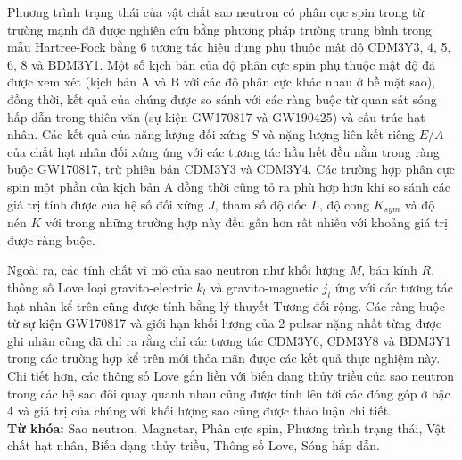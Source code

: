 Phương trình trạng thái của vật chất sao neutron có phân cực spin trong từ trường mạnh đã được nghiên cứu bằng phương pháp trường trung bình trong mẫu Hartree-Fock bằng 6 tương tác hiệu dụng phụ thuộc mật độ CDM3Y3, 4, 5, 6, 8 và BDM3Y1. Một số kịch bản của độ phân cực spin phụ thuộc mật độ đã được xem xét (kịch bản A và B với các độ phân cực khác nhau ở bề mặt sao), đồng thời, kết quả của chúng được so sánh với các ràng buộc từ quan sát sóng hấp dẫn trong thiên văn (sự kiện GW170817 và GW190425) và cấu trúc hạt nhân. Các kết quả của năng lượng đối xứng $S$ và nặng lượng liên kết riêng $E/A$ của chất hạt nhân đối xứng ứng với các tương tác hầu hết đều nằm trong ràng buộc GW170817, trừ phiên bản CDM3Y3 và CDM3Y4. Các trường hợp phân cực spin một phần của kịch bản A đồng thời cũng tỏ ra phù hợp hơn khi so sánh các giá trị tính được của hệ số đối xứng $J$, tham số độ dốc $L$, độ cong $K_{sym}$ và độ nén $K$ với trong những trường hợp này đều gần hơn rất nhiều với khoảng giá trị được ràng buộc.\par
Ngoài ra, các tính chất vĩ mô của sao neutron như khối lượng $M$, bán kính $R$, thông số Love loại gravito-electric $k_l$ và gravito-magnetic $j_l$ ứng với các tương tác hạt nhân kể trên cũng được tính bằng lý thuyết Tương đối rộng. Các ràng buộc từ sự kiện GW170817 và giới hạn khối lượng của 2 pulsar nặng nhất từng được ghi nhận cũng đã chỉ ra rằng chỉ các tương tác CDM3Y6, CDM3Y8 và BDM3Y1 trong các trường hợp kể trên mới thỏa mãn được các kết quả thực nghiệm này. Chi tiết hơn, các thông số Love gắn liền với biến dạng thủy triều của sao neutron trong các hệ sao đôi quay quanh nhau cũng được tính lên tới các đóng góp ở bậc 4 và giá trị của chúng với khối lượng sao cũng được thảo luận chi tiết.\\[5mm]
\textbf{Từ khóa:} Sao neutron, Magnetar, Phân cực spin, Phương trình trạng thái, Vật chất hạt nhân, Biến dạng thủy triều, Thông số Love, Sóng hấp dẫn.
